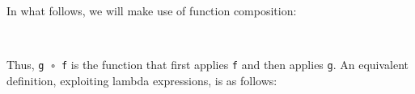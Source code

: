 In what follows, we will make use of function composition:

\begin{fence}
\begin{code}%
\>[0]\AgdaSpace{}%
\AgdaSymbol{:}\AgdaSpace{}%
\AgdaSpace{}%
\AgdaSymbol{\{}\AgdaSpace{}%
\AgdaSpace{}%
\AgdaSpace{}%
\AgdaSymbol{:}\AgdaSpace{}%
\AgdaSymbol{\}}\AgdaSpace{}%
\AgdaSpace{}%
\AgdaSymbol{(}\AgdaSpace{}%
\AgdaSpace{}%
\AgdaSymbol{)}\AgdaSpace{}%
\AgdaSpace{}%
\AgdaSymbol{(}\AgdaSpace{}%
\AgdaSpace{}%
\AgdaSymbol{)}\AgdaSpace{}%
\AgdaSpace{}%
\AgdaSymbol{(}\AgdaSpace{}%
\AgdaSpace{}%
\AgdaSymbol{)}\<%
\\
\>[0]\AgdaSymbol{(}\AgdaSpace{}%
\AgdaSpace{}%
\AgdaSymbol{)}\AgdaSpace{}%
%
\>[11]\AgdaSymbol{=}\AgdaSpace{}%
\AgdaSpace{}%
\AgdaSymbol{(}\AgdaSpace{}%
\AgdaSymbol{)}\<%
\end{code}
\end{fence}

Thus, \texttt{g\ ∘\ f} is the function that first applies \texttt{f} and
then applies \texttt{g}. An equivalent definition, exploiting lambda
expressions, is as follows:

\begin{fence}
\begin{code}%
\>[0]\AgdaSpace{}%
\AgdaSymbol{:}\AgdaSpace{}%
\AgdaSpace{}%
\AgdaSymbol{\{}\AgdaSpace{}%
\AgdaSpace{}%
\AgdaSpace{}%
\AgdaSymbol{:}\AgdaSpace{}%
\AgdaSymbol{\}}\AgdaSpace{}%
\AgdaSpace{}%
\AgdaSymbol{(}\AgdaSpace{}%
\AgdaSpace{}%
\AgdaSymbol{)}\AgdaSpace{}%
\AgdaSpace{}%
\AgdaSymbol{(}\AgdaSpace{}%
\AgdaSpace{}%
\AgdaSymbol{)}\AgdaSpace{}%
\AgdaSpace{}%
\AgdaSymbol{(}\AgdaSpace{}%
\AgdaSpace{}%
\AgdaSymbol{)}\<%
\\
\>[0]\AgdaSpace{}%
\AgdaSpace{}%
%
\>[8]\AgdaSymbol{=}%
\>[11]\AgdaSpace{}%
\AgdaSpace{}%
\AgdaSpace{}%
\AgdaSpace{}%
\AgdaSymbol{(}\AgdaSpace{}%
\AgdaSymbol{)}\<%
\end{code}
\end{fence}

